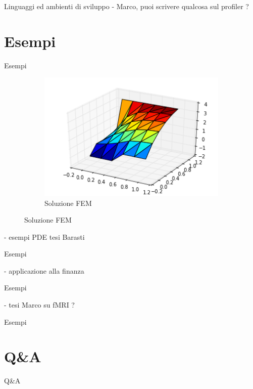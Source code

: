 \documentclass{beamer}
\begin{document}
\begin{frame}{Linguaggi ed ambienti di sviluppo}
- Marco, puoi scrivere qualcosa sul profiler ?

\end{frame}



\section{Esempi}
\begin{frame}{Esempi}

\begin{figure}
\centering
\begin{subfigure}{.5\textwidth}
  \centering
  \includegraphics[scale=0.5]{calore.png}
  \caption{Soluzione FEM}
\end{subfigure}%
\end{figure}

- esempi PDE tesi Barasti

\end{frame}


\begin{frame}{Esempi}

- applicazione alla finanza

\end{frame}


\begin{frame}{Esempi}

- tesi Marco su fMRI ?

\end{frame}


\begin{frame}{Esempi}

\end{frame}

\section{Q\&A}
\begin{frame}{Q\&A}
\end{frame}
\end{document}

